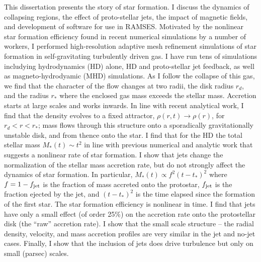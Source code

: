 \documentclass[12pt,notitlepage]{report}
\begin{document}
This dissertation presents the story of star formation. 
I discuss the dynamics of collapsing regions, the effect of proto-stellar jets, the impact of magnetic fields, and development of software for use in RAMSES.
Motivated by the nonlinear star formation efficiency found in recent numerical simulations by a number of workers, I performed high-resolution adaptive mesh refinement simulations of star formation in self-gravitating turbulently driven gas. 
I have run tens of simulations includying hydrodynamics (HD) alone, HD and proto-stellar jet feedback, as well as magneto-hydrodyamic (MHD) simulations.
As I follow the collapse of this gas, we find that the character of the flow changes at two radii, the disk radius $r_d$, and the radius $r_*$ where the enclosed gas mass exceeds the stellar mass. 
Accretion starts at large scales and works inwards. 
In line with recent analytical work, I find that the density evolves to a fixed attractor, $\rho(r,t ) \rightarrow \rho(r)$, for $r_d<r<r_*$; mass flows through this structure onto a sporadically gravitationally unstable disk, and from thence onto the star. 
I find that for the HD the total stellar mass $M_*(t)\sim t^2$ in line with previous numerical and analytic work that suggests a nonlinear rate of star formation.
I show that jets change the normalization of the stellar mass accretion rate, but do not strongly affect the dynamics of star formation.
In particular, $M_*(t) \propto f^2 (t-t_*)^2$ where $f = 1 - f_{\rm jet}$ is the fraction of mass accreted onto the protostar, $f_{\rm jet}$ is the fraction ejected by the jet, and $(t-t_*)^2$ is the time elapsed since the formation of the first star.
The star formation efficiency is nonlinear in time.
I find that jets have only a small effect (of order 25\%) on the accretion rate onto the protostellar disk (the ``raw'' accretion rate).
I show that the small scale structure -- the radial density, velocity, and mass accretion profiles are very similar in the jet and no-jet cases.
Finally, I show that the inclusion of jets does drive turbulence but only on small (parsec) scales.

\endabstract 
\newpage
\end{document}
